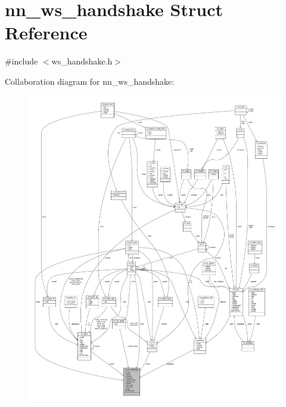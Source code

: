 \hypertarget{structnn__ws__handshake}{}\section{nn\+\_\+ws\+\_\+handshake Struct Reference}
\label{structnn__ws__handshake}


{\ttfamily \#include $<$ws\+\_\+handshake.\+h$>$}



Collaboration diagram for nn\+\_\+ws\+\_\+handshake\+:\nopagebreak
\begin{figure}[H]
\begin{center}
\leavevmode
\includegraphics[width=350pt]{structnn__ws__handshake__coll__graph}
\end{center}
\end{figure}
